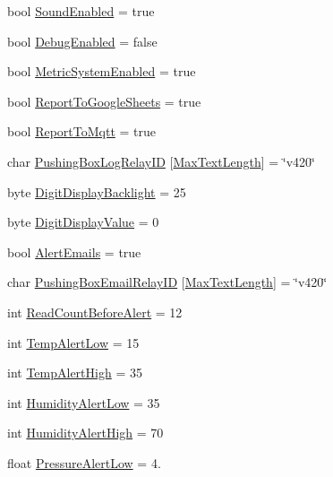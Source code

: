 \begin{DoxyCompactItemize}
\item 
bool \mbox{\hyperlink{struct_settings_a8783f1cddf80706f13662f13168c3dbe}{Sound\+Enabled}} = true
\item 
bool \mbox{\hyperlink{struct_settings_a84c9031aeb684accddd3ff472b96682d}{Debug\+Enabled}} = false
\item 
bool \mbox{\hyperlink{struct_settings_a4879a55e1688318b681f67d40100f768}{Metric\+System\+Enabled}} = true
\item 
bool \mbox{\hyperlink{struct_settings_a950aa2fd9963a7193b6aecc16b1b4526}{Report\+To\+Google\+Sheets}} = true
\item 
bool \mbox{\hyperlink{struct_settings_a096bff8ddaf4783fb60a9c68ec2ae93d}{Report\+To\+Mqtt}} = true
\item 
char \mbox{\hyperlink{struct_settings_a11215ddb067966c42e89de5b6fec802f}{Pushing\+Box\+Log\+Relay\+ID}} \mbox{[}\mbox{\hyperlink{420_settings_8h_a1b8e1e4d41c8b790a064405b0c219a6c}{Max\+Text\+Length}}\mbox{]} = \char`\"{}v420\char`\"{}
\item 
byte \mbox{\hyperlink{struct_settings_a1631b98ed48aad24809ede99512a5a7a}{Digit\+Display\+Backlight}} = 25
\item 
byte \mbox{\hyperlink{struct_settings_a427897ae557b8c65d3797cae3aac1743}{Digit\+Display\+Value}} = 0
\item 
bool \mbox{\hyperlink{struct_settings_ab5da35043f9751f24f9bce845e6396f9}{Alert\+Emails}} = true
\item 
char \mbox{\hyperlink{struct_settings_aaaa2bdabbe0ea51ea21faf6e1a8563ed}{Pushing\+Box\+Email\+Relay\+ID}} \mbox{[}\mbox{\hyperlink{420_settings_8h_a1b8e1e4d41c8b790a064405b0c219a6c}{Max\+Text\+Length}}\mbox{]} = \char`\"{}v420\char`\"{}
\item 
int \mbox{\hyperlink{struct_settings_a1ec02930a5369af829e9bab51d4dc83b}{Read\+Count\+Before\+Alert}} = 12
\item 
int \mbox{\hyperlink{struct_settings_a59dc94676139ca6cb989cf4309cb08ef}{Temp\+Alert\+Low}} = 15
\item 
int \mbox{\hyperlink{struct_settings_a82a8c74eaac47ab4be913690cdb3fa44}{Temp\+Alert\+High}} = 35
\item 
int \mbox{\hyperlink{struct_settings_a309c0556e0a03513e80ae4265ee92f80}{Humidity\+Alert\+Low}} = 35
\item 
int \mbox{\hyperlink{struct_settings_a13511927e8e41fbe768f5629bba2e92b}{Humidity\+Alert\+High}} = 70
\item 
float \mbox{\hyperlink{struct_settings_a9e436ca0596493ca600e14aab8b2b229}{Pressure\+Alert\+Low}} = 4.

\end{DoxyCompactItemize}
